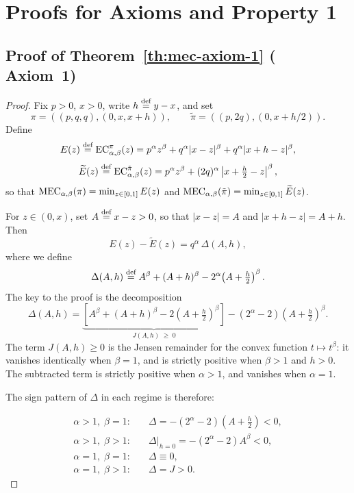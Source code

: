 \section{Proofs for \texorpdfstring{\ERLabel}{ER} Axioms and Property 1}
\label{appendix:MEC_proofs}

\subsection{Proof of Theorem~\ref{th:mec-axiom-1} (\texorpdfstring{\ERLabel}{ER} Axiom~1)}
\label{appendix:proof-mec-axiom-1}

\mecAxiomOne*
\begin{proof}
Fix $p>0$, $x>0$, write $h\stackrel{\text{def}}{=} y-x$, and set
\[
  \pi=((p,q,q),(0,x,x+h)),
  \qquad
  \tilde\pi=((p,2q),(0,x+h/2)).
\]
Define
\[
  E(z)\defsymbol \EC[\alpha,\beta][\pi](z)
  =p^\alpha z^\beta+q^\alpha\lvert x-z\rvert^\beta+q^\alpha\lvert x+h-z\rvert^\beta,
\]
\[
  \widetilde E(z)\defsymbol \EC[\alpha,\beta][\tilde\pi](z)
  =p^\alpha z^\beta+(2q)^\alpha\left\lvert x+\tfrac{h}{2}-z\right\rvert^\beta,
\]
so that $\MEC(\pi)=\min_{z\in[0,1]}E(z)$ and $\MEC(\tilde\pi)=\min_{z\in[0,1]}\widetilde E(z)$.


For $z\in(0,x)$, set $A\stackrel{\text{def}}{=} x-z>0$, so that $\lvert x-z\rvert=A$ and
$\lvert x+h-z\rvert=A+h$. Then
\begin{equation}
  \label{eq:central}
  E(z)-\widetilde{E}(z)=q^\alpha\,\Delta(A,h),
\end{equation}
where we define
\[
  \Delta(A,h)\stackrel{\text{def}}{=} A^\beta+(A+h)^\beta-2^\alpha\!\left(A+\tfrac{h}{2}\right)^\beta.
\]
The key to the proof is the decomposition
\begin{equation}
  \label{eq:decomp}
  \Delta(A,h)
  =\underbrace{\left[A^\beta+(A+h)^\beta-2\!\left(A+\tfrac{h}{2}\right)^\beta\right]}_{J(A,h)\;\geq\;0}
  -(2^\alpha-2)\!\left(A+\tfrac{h}{2}\right)^\beta.
\end{equation}
The term $J(A,h)\geq 0$ is the Jensen remainder for the convex function
$t\mapsto t^\beta$: it vanishes identically when $\beta=1$, and is strictly
positive when $\beta>1$ and $h>0$. The subtracted term is strictly positive
when $\alpha>1$, and vanishes when $\alpha=1$.

The sign pattern of $\Delta$ in each regime is therefore:

\begin{equation}
  \label{eq:signs}
  \begin{aligned}
    \alpha>1,\;\beta=1\colon\quad &\Delta=-(2^\alpha-2)\!\left(A+\tfrac h2\right)<0,\\
    \alpha>1,\;\beta>1\colon\quad &\Delta\big\vert_{h=0}=-(2^\alpha-2)A^\beta<0,\\
    \alpha=1,\;\beta=1\colon\quad &\Delta\equiv 0,\\
    \alpha=1,\;\beta>1\colon\quad &\Delta=J>0.
  \end{aligned}
\end{equation}


\end{proof}
